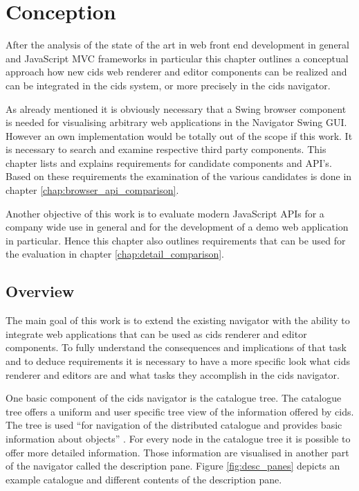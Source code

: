 \chapter{Conception}\label{chap:conception}
After the analysis of the state of the art in web front end development in general and JavaScript MVC frameworks in particular this chapter outlines a conceptual approach how new cids web renderer and editor components can be realized and can be integrated in the cids system, or more precisely in the cids navigator.

As already mentioned it is obviously necessary that a Swing browser component is needed for visualising arbitrary web applications in the Navigator Swing GUI.
However an own implementation would be totally out of the scope if this work. It is necessary to search and examine respective third party components.
This chapter lists and explains requirements for candidate components and API's.
Based on these requirements the examination of the various candidates is done in chapter \ref{chap:browser_api_comparison}.

Another objective of this work is to evaluate modern JavaScript APIs for a company wide use in general and for the development of a demo web application in particular.
Hence this chapter also outlines requirements that can be used for the evaluation in chapter \ref{chap:detail_comparison}.

\section{Overview}

The main goal of this work is to extend the existing navigator with the ability to integrate web applications that can be used as cids renderer and editor components.
To fully understand the consequences and implications of that task and to deduce requirements it is necessary to have a more specific look what cids renderer and editors are and what tasks they accomplish in the cids navigator.

One basic component of the cids navigator is the catalogue tree.
The catalogue tree offers a uniform and user specific tree view of the information offered by cids.
The tree is used \enquote{for navigation of the distributed catalogue and provides basic information about objects} \autocite{cismet-cids-readMe}.
For every node in the catalogue tree it is possible to offer more detailed information.
Those information are visualised in another part of the navigator called the description pane.
Figure \ref{fig:desc_panes} depicts an example catalogue and different contents of the description pane.


